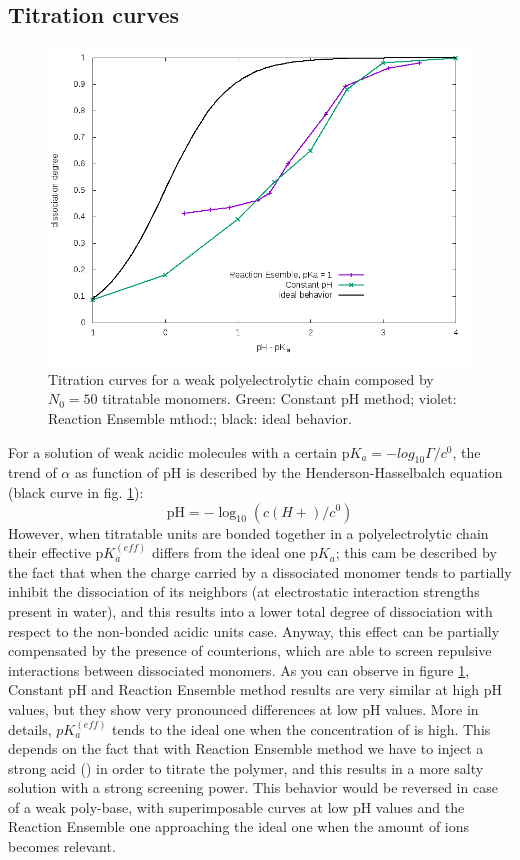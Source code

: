 \documentclass[
a4paper,                        %
11pt,                           %
twoside,                        %
footsepline,                    %
headsepline,                    %
headexclude,                    %
footexclude,                    %
pagesize,                       %
]{scrartcl}
\begin{document}
\subsection{Titration curves}

\begin{figure}[tb]
	\centering
	\includegraphics[scale=0.5]{figures/titration.png}
	\caption{Titration curves for a weak polyelectrolytic chain composed by $N_0=50$ titratable monomers. Green: Constant pH method; violet: Reaction Ensemble mthod:; black: ideal behavior.}
	\label{titration}
\end{figure}

For a solution of weak acidic molecules with a certain $\text{p}K_a=-log_{10}{\Gamma/c^0}$, the trend of $\alpha$ as function of pH is described by the Henderson-Hasselbalch equation (black curve in fig. \ref{titration}):
\begin{equation}
\text{pH} = -\log_{10}(c(H+)/c^0)
\end{equation}
However, when titratable units are bonded together in a polyelectrolytic chain their effective $\text{p}K_{a}^{(eff)}$ differs from the ideal one $\text{p}K_a$; this cam be described by the fact that when the charge carried by a dissociated monomer tends to partially inhibit the dissociation of its neighbors (at electrostatic interaction strengths present in water), and this results into a lower total degree of dissociation with respect to the non-bonded acidic units case. Anyway, this effect can be partially compensated by the presence of counterions, which are able to  screen repulsive interactions between dissociated monomers. As you can observe in figure \ref{titration}, Constant pH and Reaction Ensemble method results are very similar at high pH values, but they show very pronounced differences at low pH values. More in details, $pK_{a}^{(eff)}$ tends to the ideal one when the concentration of  is high. This depends on the fact that with Reaction Ensemble method we have to inject a strong acid () in order to titrate the polymer, and this results in a more salty solution with a strong screening power. This behavior would be reversed in case of a weak poly-base, with superimposable curves at low pH values and the Reaction Ensemble one approaching the ideal one when the amount of  ions becomes relevant.
 
\end{document}
